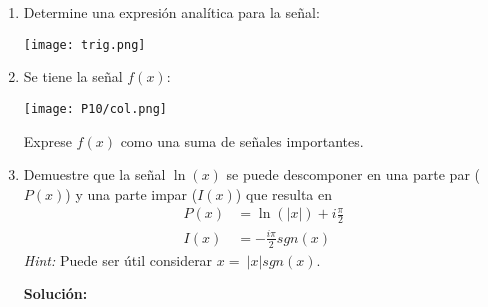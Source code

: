 \documentclass[letterpaper, 12pt]{article}
\newif\ifanswers
\begin{document}
\begin{enumerate}




    \item Determine una expresión analítica para la señal:
    
             \begin{center} {\texttt{[image: trig.png]}} \end{center}
    
        
        \ifanswers
        {\color{red}
        \textbf{Solución:}
    
    Son triángulos desfasados cada 5, por lo que se puede entender como que en cada múltiplo de 5 hay un $\delta(x)$ lo que sería un peine de impulsos:
    
        $$\frac{1}{5}\sha(\frac{x}{5})*\wedge(x)$$
        }
    
        \fi


    \item Se tiene la señal $f(x)$:

         \begin{center} {\texttt{[image: P10/col.png]}} \end{center}
    Exprese $f(x)$ como una suma de señales importantes.

    
    
    \ifanswers
    {\color{red}
    \textbf{Solución:}

 Se puede resolver de dos maneras por tanteo:
    $$f(x) = u(x-1/2) -u(-(x + 1/2))$$ o de otra manera más fácil de ver:
    $$ f(x) = sgn(x)(1- \sqcap(x))$$
    }

    \fi

    \item Demuestre que la señal $\ln(x)$ se puede descomponer en una parte par ($P(x)$) y una parte impar ($I(x)$) que resulta en
    \begin{align*}
        P(x) &= \ln(|x|)+i\frac{\pi}{2} \\
        I(x) &= -\frac{i \pi}{2} sgn(x)
    \end{align*}
    \emph{Hint: } Puede ser útil considerar $x = \ |x| sgn(x)$.

    \ifanswers
   {\color{red} \textbf{Solución:}
    
}
\end{enumerate}
\end{document}
